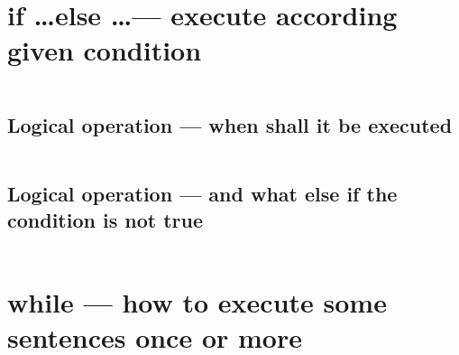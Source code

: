\documentclass[
  11pt, %
  xcolor=dvipsnames
]{beamer}
\begin{document}

\section{if \dots else \dots --- execute according given condition}
\begin{frame}[fragile]

	\begin{columns}[c]
		\begin{column}{0.9\textwidth}


		\end{column}
	\end{columns}

\end{frame}

\subsection{Logical operation --- when shall it be executed}
\begin{frame}[fragile]

	\begin{columns}[c]
		\begin{column}{0.9\textwidth}


		\end{column}
	\end{columns}

\end{frame}

\subsection{Logical operation --- and what else if the condition is not true}
\begin{frame}[fragile]

	\begin{columns}[c]
		\begin{column}{0.9\textwidth}


		\end{column}
	\end{columns}

\end{frame}


\section{while --- how to execute some sentences once or more}
\begin{frame}[fragile]

	\begin{columns}[c]
		\begin{column}{0.9\textwidth}


		\end{column}
	\end{columns}

\end{frame}
\end{document}
